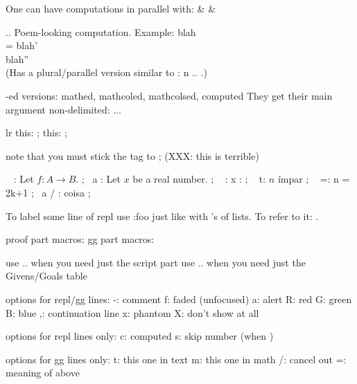 One can have computations in parallel with:
 &  & 
\endfuncomputes

\poemcompute .. \endpoemcompute
Poem-looking computation.
Example:
\poemcompute
blah \\
  =    blah'    \\
  \leq blah''   \\
\endpoemcompute
(Has a plural/parallel version similar to \funcomputes: \poemcomputes n .. \endpoemcomputes.)

-ed versions: mathed, mathcoled, mathcolsed, computed
They get their main argument non-delimited:
 { ... }


\context lr %
\x this: \reals ;
\x this: \reals \mtag[spot=*];
\endcontext

note that you must stick the \*tag to ;
(XXX: this is terrible)

\repl
~    : Let $f : A \to B$. ;
~a   : Let $x$ be a real number. ;
\givens
~    : x : \Nat ;
~   t: $n$ ímpar ;
~   =:  {n = 2k+1} ;
\goals
~a / : coisa ;
\endrepl

To label some line of repl use  :foo  just like with \li's of lists.
To refer to it: .

proof part macros: \hidenum \shownum
   gg part macros: \intext \inmath

use \replproof .. \endreplproof when you need just the script part
use \repltable .. \endrepltable when you need just the Givens/Goals table

options for repl/gg lines:
  -: comment
  f: faded (unfocused)
  a: alert
  R: red
  G: green
  B: blue
  ,: continuation line
  x: phantom
  X: don't show at all

options for repl lines only:
  c: computed
  s: skip number (when \shownum)

options for gg lines only:
  t: this one in text
  m: this one in math
  /: cancel out
  =: meaning of above

